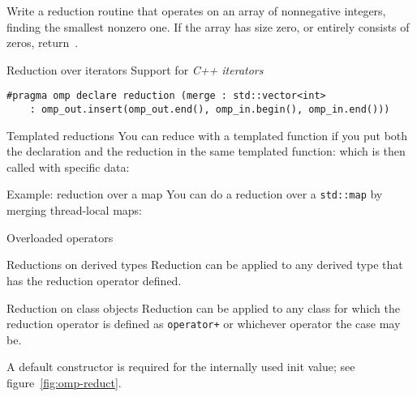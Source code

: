 \begin{exercise}
  Write a reduction routine that operates on an array of nonnegative
  integers, finding the smallest nonzero one. If the array has size
  zero, or entirely consists of zeros, return~.
\end{exercise}

\begin{cppnote}{Reduction over iterators}
  Support for
  \emph{C++ iterators}
\begin{lstlisting}
#pragma omp declare reduction (merge : std::vector<int>
    : omp_out.insert(omp_out.end(), omp_in.begin(), omp_in.end())) 
\end{lstlisting}
\end{cppnote}

\begin{cppnote}{Templated reductions}
  You can reduce with a templated function
  if you put both the declaration and the reduction
  in the same templated function:
  which is then called with specific data:
\end{cppnote}

\begin{cppnote}{Example: reduction over a map}
  You can do a reduction over a \lstinline{std::map}
  by merging thread-local maps:
  \begin{multicols}{2}
    \columnbreak
  \end{multicols}
\end{cppnote}

 {Overloaded operators}

\begin{fortrannote}{Reductions on derived types}
  Reduction can be applied to any derived type that has the
  reduction operator defined.
  \begin{multicols}{2}
    \columnbreak
  \end{multicols}
  
\end{fortrannote}

\begin{cppnote}{Reduction on class objects}
  Reduction can be applied to any class for which the
  reduction operator is defined as \lstinline{operator+}
  or whichever operator the case may be.
  \begin{multicols}{2}
    \columnbreak
  \end{multicols}
  A default constructor is required for the
  internally used init value;
  see figure~\ref{fig:omp-reduct}.
\end{cppnote}

